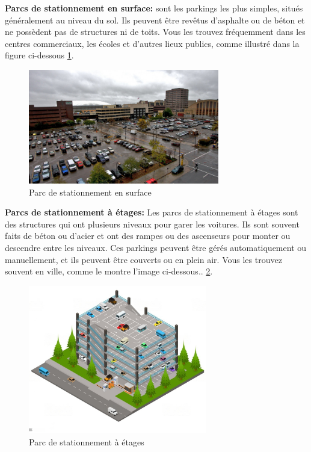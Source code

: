 \begin{outline}
\1 \textbf{ Parcs de stationnement en surface:} sont les parkings les plus simples, situés généralement au niveau du sol. Ils peuvent être revêtus d'asphalte ou de béton et ne possèdent pas de structures ni de toits. Vous les trouvez fréquemment dans les centres commerciaux, les écoles et d'autres lieux publics, comme illustré dans la figure ci-dessous \ref{Surfacepark}.

\begin{figure}[H]
	\centering
	\includegraphics[height=05cm]{img/ch1-Surface parking-01.jpg}
	\caption{Parc de stationnement en surface}
 \label{Surfacepark}
\end{figure}

\1 \textbf{ Parcs de stationnement à étages: } Les parcs de stationnement à étages sont des structures qui ont plusieurs niveaux pour garer les voitures. Ils sont souvent faits de béton ou d'acier et ont des rampes ou des ascenseurs pour monter ou descendre entre les niveaux. Ces parkings peuvent être gérés automatiquement ou manuellement, et ils peuvent être couverts ou en plein air. Vous les trouvez souvent en ville, comme le montre l'image ci-dessous.. \ref{storeypark}.

\begin{figure}[H]
	\centering
	\includegraphics[height=06.5cm]{img/ch1-Multi-storey parking garages-01.jpeg}
	\caption{Parc de stationnement à étages}
 \label{storeypark}
 \end{figure}



\end{outline}
